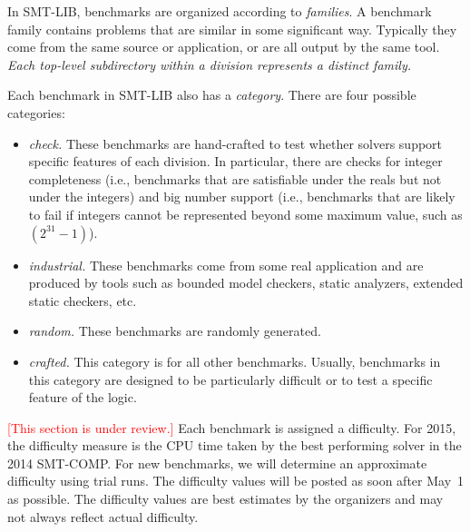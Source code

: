 \documentclass[12pt]{article}
\newcommand{\remark}[1]{{\small\textcolor{red}{[#1]}}}
\begin{document}
In SMT-LIB, benchmarks are organized according to \emph{families}.  A benchmark
family contains problems that are similar in some significant way.  Typically
they come from the same source or application, or are all output by the same
tool.  \emph{Each top-level subdirectory within a division represents a distinct
family.}
%

Each benchmark in SMT-LIB also has a \emph{category}.  There are four possible
categories:
%
\begin{itemize}
\item \emph{check.} These benchmarks are hand-crafted to test whether
  solvers support specific features of each division.  In particular,
  there are checks for integer completeness (i.e., benchmarks that are
  satisfiable under the reals but not under the integers) and big
  number support (i.e., benchmarks that are likely to fail if integers
  cannot be represented beyond some maximum value, such as
  $(2^{31}-1)$).

\item \emph{industrial.} These benchmarks come from some real
  application and are produced by tools such as bounded model
  checkers, static analyzers, extended static checkers, etc.

\item \emph{random.} These benchmarks are randomly generated.

\item \emph{crafted.} This category is for all other benchmarks.
  Usually, benchmarks in this category are designed to be particularly
  difficult or to test a specific feature of the logic.
\end{itemize}

 \remark{This section is under review.}
%
Each benchmark is assigned a difficulty. For 2015, the difficulty
measure is the CPU time taken by the best performing solver in the
2014 SMT-COMP.  For new benchmarks, we will determine an approximate
difficulty using trial runs.  The difficulty values will be posted as
soon after May~1 as possible.  The difficulty values are best
estimates by the organizers and may not always reflect actual
difficulty.
\end{document}
